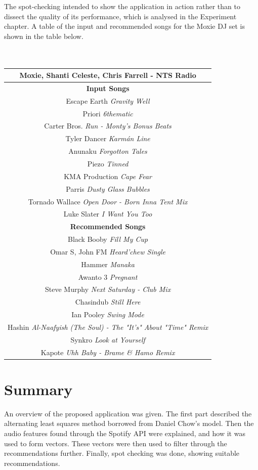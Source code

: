 The spot-checking intended to show the application in action rather than to dissect the quality of its performance, which is analysed in the Experiment chapter. A table of the input and recommended songs for the Moxie DJ set is shown in the table below.
\\
\\
\\
\begin{center}
	\begin{tabular}{ |c|} 
		\hline
		\textbf{Moxie, Shanti Celeste, Chris Farrell - NTS Radio}\\ 
		\hline \textbf{Input Songs}\\ 
		\hline Escape Earth \textit{Gravity Well} \\ 
		\hline Priori \textit{6thematic }\\
		\hline Carter Bros. \textit{Run - Monty's Bonus Beats}\\
		\hline Tyler Dancer \textit{Karmán Line}\\ 
		\hline Anunaku \textit{Forgotton Tales}\\
		\hline Piezo \textit{Tinned}\\
		\hline KMA Production \textit{Cape Fear}\\
		\hline Parris \textit{Dusty Glass Bubbles}\\
		\hline Tornado Wallace \textit{Open Door - Born Inna Tent Mix}\\
		\hline Luke Slater \textit{I Want You Too}\\
		\hline \textbf{Recommended Songs}\\ 
		\hline Black Booby \textit{Fill My Cup}\\
		\hline Omar S, John FM \textit{Heard'chew Single}\\
		\hline Hammer \textit{Manaka}\\
		\hline Awanto 3 \textit{Pregnant}\\
		\hline Steve Murphy \textit{Next Saturday - Club Mix}\\
		\hline Chasindub \textit{Still Here}\\
		\hline Ian Pooley \textit{Swing Mode}\\
		\hline Hashin \textit{Al-Naafyish (The Soul) - The "It's" About "Time" Remix}\\
		\hline Synkro \textit{Look at Yourself}\\
		\hline Kapote \textit{Uhh Baby - Brame \& Hamo Remix}\\
		\hline
	\end{tabular}
\end{center}


\section{Summary}
An overview of the proposed application was given. The first part described the alternating least squares method borrowed from Daniel Chow's model. Then the audio features found through the Spotify API were explained, and how it was used to form vectors. These vectors were then used to filter through the recommendations further. Finally, spot checking was done, showing suitable recommendations.


